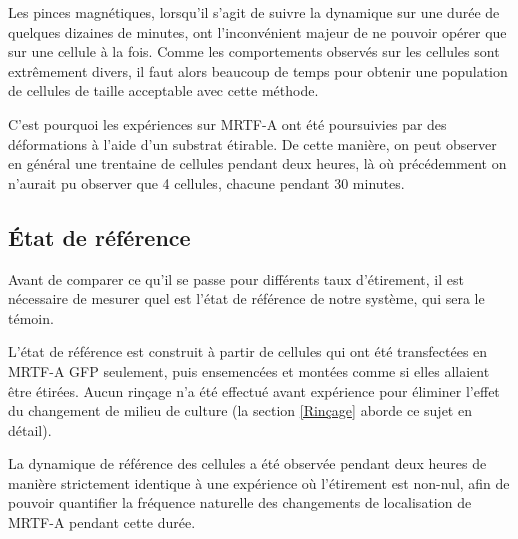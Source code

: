 Les pinces magnétiques, lorsqu'il s'agit de suivre la dynamique sur une durée de quelques dizaines de minutes, ont l'inconvénient majeur de ne pouvoir opérer que sur une cellule à la fois. Comme les comportements observés sur les cellules sont extrêmement divers, il faut alors beaucoup de temps pour obtenir une population de cellules de taille acceptable avec cette méthode. 

C'est pourquoi les expériences sur MRTF-A ont été poursuivies par des déformations à l'aide d'un substrat étirable. De cette manière, on peut observer en général une trentaine de cellules pendant deux heures, là où précédemment on n'aurait pu observer que 4 cellules, chacune pendant 30 minutes. 



\subsection{\'Etat de référence}

Avant de comparer ce qu'il se passe pour différents taux d'étirement, il est nécessaire de mesurer quel est l'état de référence de notre système, qui sera le témoin. 

L'état de référence est construit à partir de cellules qui ont été transfectées en MRTF-A GFP seulement, puis ensemencées et montées comme si elles allaient être étirées. 
Aucun rinçage n'a été effectué avant expérience pour éliminer l'effet du changement de milieu de culture (la section \ref{Rinçage} aborde ce sujet en détail). 

La dynamique de référence des cellules a été observée pendant deux heures de manière strictement identique à une expérience où l'étirement est non-nul, afin de pouvoir quantifier la fréquence naturelle des changements de localisation de MRTF-A pendant cette durée. 

